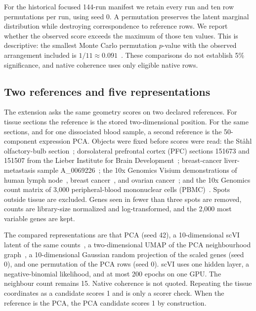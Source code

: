 \documentclass[11pt]{article}
\begin{document}
For the historical focused 144-run manifest we retain every run and ten row permutations per run, using seed 0. A permutation preserves the latent marginal distribution while destroying correspondence to reference rows. We report whether the observed score exceeds the maximum of those ten values. This is descriptive: the smallest Monte Carlo permutation $p$-value with the observed arrangement included is $1/11\approx0.091$~\cite{phipson2010permutation}. These comparisons do not establish 5\% significance, and native coherence uses only eligible native rows.

\subsection{Two references and five representations}

The extension asks the same geometry scores on two declared references. For tissue sections the reference is the stored two-dimensional position. For the same sections, and for one dissociated blood sample, a second reference is the 50-component expression PCA. Objects were fixed before scores were read: the St{\aa}hl olfactory-bulb section~\cite{stahl2016spatial}; dorsolateral prefrontal cortex (PFC) sections 151673 and 151507 from the Lieber Institute for Brain Development~\cite{maynard2021dlpfc}; breast-cancer liver-metastasis sample A\_0069226~\cite{chan2026bclm}; the 10x Genomics Visium demonstrations of human lymph node~\cite{tenxlymph}, breast cancer~\cite{tenxbreast}, and ovarian cancer~\cite{tenxovary}; and the 10x Genomics count matrix of 3,000 peripheral-blood mononuclear cells (PBMC)~\cite{tenxpbmc3k,zheng2017massively}. Spots outside tissue are excluded. Genes seen in fewer than three spots are removed, counts are library-size normalized and log-transformed, and the 2{,}000 most variable genes are kept.

The compared representations are that PCA (seed 42), a 10-dimensional scVI latent of the same counts~\cite{lopez2018scvi,gayoso2022scvitools}, a two-dimensional UMAP of the PCA neighbourhood graph~\cite{becht2019umap}, a 10-dimensional Gaussian random projection of the scaled genes (seed 0), and one permutation of the PCA rows (seed 0). scVI uses one hidden layer, a negative-binomial likelihood, and at most 200 epochs on one GPU. The neighbour count remains 15. Native coherence is not quoted. Repeating the tissue coordinates as a candidate scores 1 and is only a scorer check. When the reference is the PCA, the PCA candidate scores 1 by construction.
\end{document}
